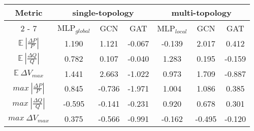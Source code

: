 \makegapedcells\begin{tabular}{|c||c|c|c||c|c|c|}%
                   \hline%
                   \multirow{2}{*}{Metric} & \multicolumn{3}{c||}{single{-}topology} & \multicolumn{3}{c|}{multi{-}topology} \\%
                   \cline{2%
                   -%
                   7}%
                   & MLP$_{global}$ & GCN      & GAT      & MLP$_{local}$ & GCN      & GAT      \\%
                   \hline%
                   $\mathbb{E} \ |\frac{\Delta P}{P}|$ & 1.190          & 1.121    & {-}0.067 & {-}0.139      & 2.017    & 0.412    \\%
                   \hline%
                   $\mathbb{E} \ |\frac{\Delta Q}{Q}|$ & 0.782          & 0.107    & {-}0.040 & 1.283         & 0.195    & {-}0.159 \\%
                   \hline%
                   $\mathbb{E} \ \Delta V_{max}$       & 1.441          & 2.663    & {-}1.022 & 0.973         & 1.709    & {-}0.887 \\%
                   \hline%
                   $max \ |\frac{\Delta P}{P}|$        & 0.845          & {-}0.736 & {-}1.971 & 1.004         & 1.086    & 0.385    \\%
                   \hline%
                   $max \ |\frac{\Delta Q}{Q}|$        & {-}0.595       & {-}0.141 & {-}0.231 & 0.920         & 0.678    & 0.301    \\%
                   \hline%
                   $max \ \Delta V_{max}$              & 0.375          & {-}0.566 & {-}0.991 & {-}0.162      & {-}0.495 & {-}0.120 \\%
                   \hline%
\end{tabular}